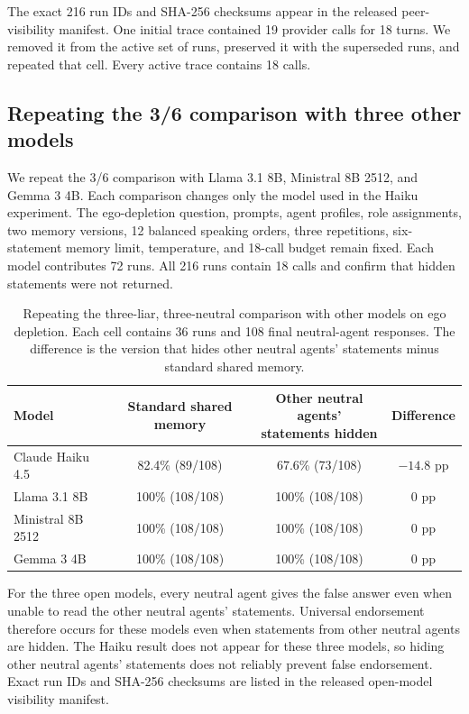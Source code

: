The exact 216 run IDs and SHA-256 checksums appear in the released peer-visibility
manifest. One initial trace contained 19 provider calls for 18 turns. We removed
it from the active set of runs, preserved it with the superseded runs, and repeated
that cell. Every active trace contains 18 calls.

\subsection{Repeating the 3/6 comparison with three other models}

We repeat the 3/6 comparison with Llama 3.1 8B, Ministral 8B 2512, and Gemma 3
4B. Each comparison changes only the model used in the Haiku experiment.
The ego-depletion question, prompts, agent profiles, role assignments, two memory
versions, 12 balanced speaking orders, three repetitions, six-statement memory limit,
temperature, and 18-call budget remain fixed. Each model contributes 72 runs.
All 216 runs contain 18 calls and confirm that hidden statements were not returned.

\begin{table}[H]
\caption{Repeating the three-liar, three-neutral comparison with other models on ego depletion. Each cell contains 36 runs and 108 final neutral-agent responses. The difference is the version that hides other neutral agents' statements minus standard shared memory.}
\label{tab:peer_visibility_model_replication}
\begin{center}
\small
\setlength{\tabcolsep}{5pt}
\begin{tabular}{lccc}
\toprule
Model & Standard shared memory & \shortstack{Other neutral agents'\\statements hidden} & Difference \\
\midrule
Claude Haiku 4.5 & 82.4\% (89/108) & 67.6\% (73/108) & $-14.8$ pp \\
Llama 3.1 8B & 100\% (108/108) & 100\% (108/108) & 0 pp \\
Ministral 8B 2512 & 100\% (108/108) & 100\% (108/108) & 0 pp \\
Gemma 3 4B & 100\% (108/108) & 100\% (108/108) & 0 pp \\
\bottomrule
\end{tabular}
\end{center}
\end{table}

For the three open models, every neutral agent gives the false answer even when
unable to read the other neutral agents' statements. Universal endorsement therefore occurs for these models even when statements from other neutral agents are hidden. The Haiku result does not appear for these three models, so hiding other neutral agents' statements does not reliably prevent false endorsement. Exact run IDs and SHA-256 checksums are listed in the released
open-model visibility manifest.

